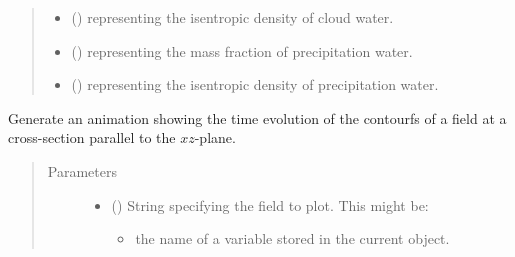 \documentclass[letterpaper,10pt,english]{sphinxmanual}
\begin{document}
\begin{fulllineitems}
\begin{fulllineitems}
\begin{quote}
\begin{description}
\begin{itemize}
\item {} 
 () \textendash{}  representing the isentropic density of cloud water.

\item {} 
 () \textendash{}  representing the mass fraction of precipitation water.

\item {} 
 () \textendash{}  representing the isentropic density of precipitation water.

\end{itemize}

\end{description}\end{quote}

\end{fulllineitems}


\begin{fulllineitems}
\label{\detokenize{api:tasmania.storages.state_isentropic.StateIsentropic.animation_contourf_xz}}
Generate an animation showing the time evolution of the contourfs of a field at a cross-section
parallel to the \(xz\)-plane.
\begin{quote}\begin{description}
\item[{Parameters}] \leavevmode\begin{itemize}
\item {} 
 () \textendash{} 
String specifying the field to plot. This might be:
\begin{itemize}
\item {} 
the name of a variable stored in the current object.


\end{itemize}
\end{itemize}
\end{description}
\end{quote}
\end{fulllineitems}
\end{fulllineitems}
\end{document}
